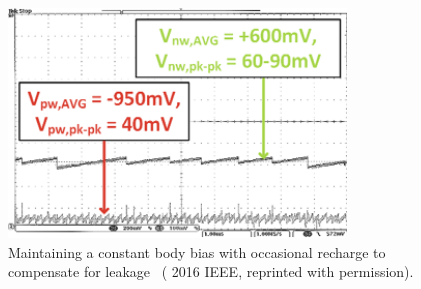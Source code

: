 \documentclass[graybox]{svmult}
\begin{document}
\begin{figure}
  \centering
  \includegraphics[width=0.8\textwidth]{bbgen-results-tracking}
  \caption{Maintaining a constant body bias with occasional recharge to compensate for leakage~\cite{Blagojevic2016} ({\textcopyright} 2016 IEEE, reprinted with permission).}
  \label{fig:bbgen-results-tracking}
\end{figure}
\end{document}
